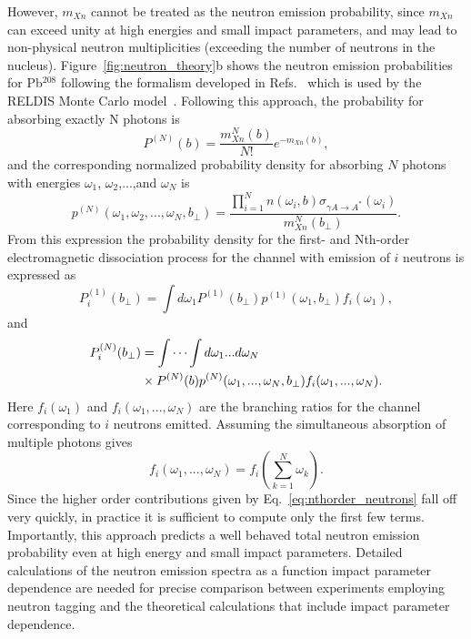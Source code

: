 \documentclass[twocolumn,epjc3]{svjour3}\sloppy
\begin{document}
However, $m_{Xn}$ cannot be treated as the neutron emission probability, since $m_{Xn}$ can exceed unity at high energies and small impact parameters, and may lead to non-physical neutron multiplicities (exceeding the number of neutrons in the nucleus). 
Figure~\ref{fig:neutron_theory}b shows the neutron emission probabilities for Pb$^{208}$ following the formalism developed in Refs.~\cite{pshenichnovMutualHeavyIon2001a,PhysRevC.60.044901} which is used by the RELDIS Monte Carlo model~\cite{pshenichnovElectromagneticExcitationFragmentation2011}.
Following this approach, the probability for absorbing exactly N photons is 
\begin{equation}
    P^{(N)}(b) = \frac{m^{N}_{Xn}(b)}{N!}e^{-m_{Xn}(b)},
\label{eq:probN_photons}
\end{equation}
and the corresponding normalized probability density for absorbing $N$ photons with energies $\omega_{1}$, $\omega_{2}$,...,and $\omega_{N}$ is~\cite{brandenburgAcoplanarityQEDPairs2020b}
\begin{equation}
    p^{(N)}(\omega_{1},\omega_{2},...,\omega_{N},b_\perp) =\frac{\prod_{i=1}^{N}n(\omega_{i},b)\sigma_{\gamma A\rightarrow A^{*}}(\omega_{i})}{m^{N}_{Xn}(b_\perp)}.
    \label{eq:photon_prob}
\end{equation}
From this expression the probability density for the first- and Nth-order electromagnetic dissociation process for the channel with emission of $i$ neutrons is expressed as
\begin{equation}
    P^{(1)}_{i}(b_\perp) =\int d\omega_{1} P^{(1)}(b_\perp) p^{(1)}(\omega_{1},b_\perp)f_{i}(\omega_{1}),
    \label{equation7}
\end{equation}
and
\begin{align}
    \label{eq:nthorder_neutrons}
    \begin{split}
    P^{(N)}_{i}(b_\perp) & = \idotsint d\omega_{1}...d\omega_{N} \\
    &\times P^{(N)}(b) p^{(N)}(\omega_{1},...,\omega_{N},b_\perp) f_{i}(\omega_{1},...,\omega_{N}).
    \end{split}
\end{align}    
Here $f_{i}(\omega_{1})$ and $f_{i}(\omega_{1},...,\omega_{N})$ are the branching ratios for the channel corresponding to $i$ neutrons emitted. Assuming the simultaneous absorption of multiple photons gives 
\begin{equation}
    f_{i}(\omega_{1},...,\omega_{N}) =f_{i}(\sum_{k =1}^{N}\omega_{k}).
\end{equation}
Since the higher order contributions given by Eq.~\ref{eq:nthorder_neutrons} fall off very quickly, in practice it is sufficient to compute only the first few terms. Importantly, this approach predicts a well behaved total neutron emission probability even at high energy and small impact parameters.
Detailed calculations of the neutron emission spectra as a function impact parameter dependence are needed for precise comparison between experiments employing neutron tagging and the theoretical calculations that include impact parameter dependence.
\end{document}
